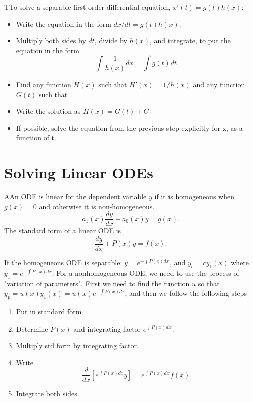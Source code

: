   \begin{theorem}
    TTo solve a separable first-order differential equation, $x'(t)=g(t)h(x)$:
    \begin{itemize}
      \item Write the equation in the form $dx/dt=g(t)h(x)$.
      \item Multiply both sides by $dt$, divide by $h(x)$, and integrate, to put the equation in the form 
        \[
          \int \frac{1}{h(x)}dx =\int g(t)dt.
        \]
      \item Find any function $H(x)$ such that $H'(x)=1/h(x)$ and any function $G(t)$ such that %
      \item Write the solution as $H(x)=G(t)+C$
      \item If possible, solve the equation from the previous step explicitly for x, as a function of t.
    \end{itemize}
  \end{theorem}

\section{Solving Linear ODEs}

 \begin{definition}
   AAn ODE is linear for the dependent variable $y$ if it is homogeneous when $g(x)=0$ and otherwise it is non-homogeneous.
   \[
     a_1(x)\frac{dy}{dx}+a_0(x)y=g(x)
   .\] 
   The standard form of a linear ODE is
   \[
     \frac{dy}{dx}+P(x)y=f(x)
   .\] 
 \end{definition}
 
 If the homogeneous ODE is separable: $y=e^{-\int P(x)dx}$, and $y_c=cy_1(x)$ where $y_1=e^{-\int P(x)dx}$. For a nonhomogeneous ODE, we need to use the process of "variation of parameters". First we need to find the function $u$ so that $y_p=u(x)y_1(x)=u(x)e^{-\int P(x)dx}$, and then we follow the following steps

 \begin{enumerate}
   \item Put in standard form
   \item Determine $P(x)$ and integrating factor $e^{\int P(x)dx}$.
   \item Multiply std form by integrating factor.
   \item Write \[
       \frac{d}{dx}\left[e^{\int P(x)dx}y\right]=e^{\int P(x)dx}f(x)
   .\] 
  \item Integrate both sides.
 \end{enumerate}

